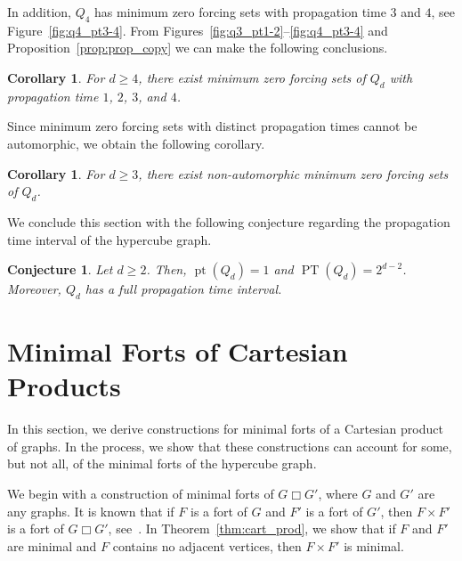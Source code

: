 \documentclass[twoside, 12pt]{article}
\newtheorem{corollary}[theorem]{Corollary}
\newtheorem{conjecture}[theorem]{Conjecture}
\theoremstyle{definition}
\DeclareMathOperator{\pt}{pt}
\DeclareMathOperator{\PT}{PT}
\begin{document}
In addition, $Q_{4}$ has minimum zero forcing sets with propagation time $3$ and $4$, see Figure~\ref{fig:q4_pt3-4}.
From Figures~\ref{fig:q3_pt1-2}--\ref{fig:q4_pt3-4} and Proposition~\ref{prop:prop_copy} we can make the following conclusions.
\begin{corollary}\label{cor:pt1-4}
For $d\geq 4$, there exist minimum zero forcing sets of $Q_{d}$ with propagation time $1$, $2$, $3$, and $4$. 
\end{corollary}

Since minimum zero forcing sets with distinct propagation times cannot be automorphic, we obtain the following corollary.
\begin{corollary}\label{cor:non_auto_zf}
For $d\geq 3$, there exist non-automorphic minimum zero forcing sets of $Q_{d}$. 
\end{corollary}

We conclude this section with the following conjecture regarding the propagation time interval of the hypercube graph.
\begin{conjecture}\label{con:full_pt_int}
Let $d\geq 2$.
Then, $\pt(Q_{d}) = 1$ and $\PT(Q_{d})=2^{d-2}$.
Moreover, $Q_{d}$ has a full propagation time interval. 
\end{conjecture}
\section{Minimal Forts of Cartesian Products}\label{sec:minimal_forts}
In this section, we derive constructions for minimal forts of a Cartesian product of graphs.
In the process, we show that these constructions can account for some, but not all, of the minimal forts of the hypercube graph.

We begin with a construction of minimal forts of $G\Box G'$, where $G$ and $G'$ are any graphs. 
It is known that if $F$ is a fort of $G$ and $F'$ is a fort of $G'$, then $F\times F'$ is a fort of $G\Box G'$, see~\cite[Proposition 4.1]{Cameron2023}.
In Theorem~\ref{thm:cart_prod}, we show that if $F$ and $F'$ are minimal and $F$ contains no adjacent vertices, then $F\times F'$ is minimal. 
\end{document}
